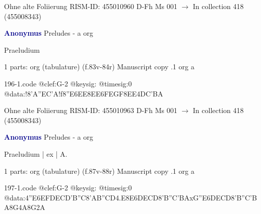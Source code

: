\documentclass[twocolumn]{book}
\begin{document}
\newline Ohne alte Foliierung
\newline RISM-ID: 455010960
\newline D-Fh  Ms 001
\newline $\rightarrow$ In collection 418 (455008343)
      
\newline \par \vspace{7pt} \textcolor{darkblue}{\textbf{Anonymus  }}
\newline Preludes - a
\newline org
\newline \begin{itshape}[f.83v, at left:] Praeludium\end{itshape} 
\newline \textcolor{darkblue}{}  1 parts: org (tabulature)  (f.83v-84r)
\newline Manuscript copy
.1  org  a  
\begin{filecontents*}{196-1.code}
@clef:G-2
@keysig:
@timesig:0
@data:!{8'A''EC'A}!f{8''E6EE}{8EE}{6FEGF}{8EE}4DC'BA
\end{filecontents*}
\newline
%

\newline Ohne alte Foliierung
\newline RISM-ID: 455010963
\newline D-Fh  Ms 001
\newline $\rightarrow$ In collection 418 (455008343)
      
\newline \par \vspace{7pt} \textcolor{darkblue}{\textbf{Anonymus  }}
\newline Preludes - a
\newline org
\newline \begin{itshape}[f.87v, at left:] Praeludium | ex | A.\end{itshape} 
\newline \textcolor{darkblue}{}  1 parts: org (tabulature)  (f.87v-88r)
\newline Manuscript copy
.1  org  a  
\begin{filecontents*}{197-1.code}
@clef:G-2
@keysig:
@timesig:0
@data:4''E{6EFDE}{CD'B''C}{8'AB}{''CD}4.E8E{6DECD}{8'B''C'BA}{xG''E}{6DECD}{8'B''C'BA}8G4A8G2A
\end{filecontents*}
\newline
%
\end{document}
